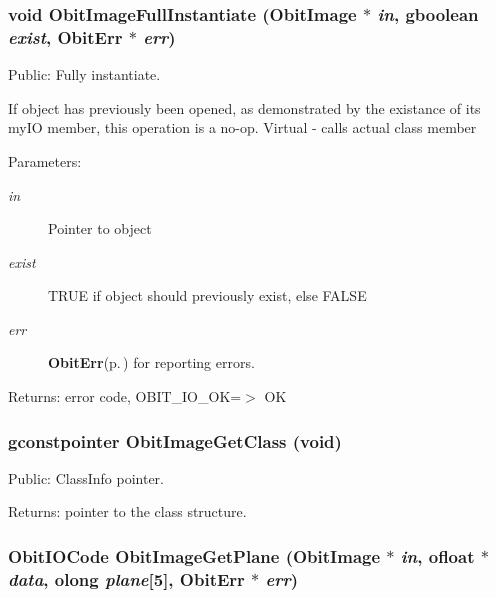 \subsubsection{\setlength{\rightskip}{0pt plus 5cm}void Obit\-Image\-Full\-Instantiate ({\bf Obit\-Image} $\ast$ {\em in}, gboolean {\em exist}, {\bf Obit\-Err} $\ast$ {\em err})}\label{ObitImage_8h_a20}


Public: Fully instantiate. 

If object has previously been opened, as demonstrated by the existance of its my\-IO member, this operation is a no-op. Virtual - calls actual class member \begin{Desc}
\item[Parameters:]
\begin{description}
\item[{\em in}]Pointer to object \item[{\em exist}]TRUE if object should previously exist, else FALSE \item[{\em err}]{\bf Obit\-Err}{\rm (p.\,\pageref{structObitErr})} for reporting errors. \end{description}
\end{Desc}
\begin{Desc}
\item[Returns:]error code, OBIT\_\-IO\_\-OK=$>$ OK \end{Desc}
\subsubsection{\setlength{\rightskip}{0pt plus 5cm}gconstpointer Obit\-Image\-Get\-Class (void)}\label{ObitImage_8h_a21}


Public: Class\-Info pointer. 

\begin{Desc}
\item[Returns:]pointer to the class structure. \end{Desc}
\subsubsection{\setlength{\rightskip}{0pt plus 5cm}Obit\-IOCode Obit\-Image\-Get\-Plane ({\bf Obit\-Image} $\ast$ {\em in}, {\bf ofloat} $\ast$ {\em data}, {\bf olong} {\em plane}[5], {\bf Obit\-Err} $\ast$ {\em err})}\label{ObitImage_8h_a33}


